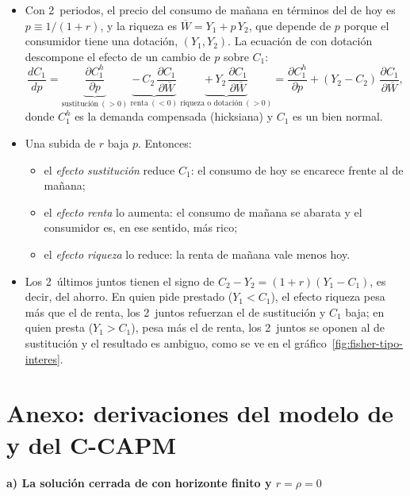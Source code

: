 \documentclass[11pt]{article}
\begin{document}
\begin{itemize}
\item Con 2~periodos, el precio del consumo de mañana en términos del de hoy es $p\equiv 1/(1+r)$, y la riqueza es $\overline{W}=Y_1+p\,Y_2$, que depende de $p$ porque el consumidor tiene una dotación, $(Y_1,Y_2)$. La ecuación de  con dotación  descompone el efecto de un cambio de $p$ sobre $C_1$:
  \begin{equation}
  \frac{dC_1}{dp}=\underbrace{\frac{\partial C_1^h}{\partial p}}_{\text{sustitución}\ (>0)}\ \underbrace{-\,C_2\,\frac{\partial C_1}{\partial\overline{W}}}_{\text{renta}\ (<0)}\ \underbrace{+\,Y_2\,\frac{\partial C_1}{\partial\overline{W}}}_{\text{riqueza o dotación}\ (>0)}=\frac{\partial C_1^h}{\partial p}+(Y_2-C_2)\,\frac{\partial C_1}{\partial\overline{W}},\label{eq:slutsky-dotacion}
  \end{equation}
  donde $C_1^h$ es la demanda compensada (hicksiana) y $C_1$ es un bien normal.
\item Una subida de $r$ baja $p$. Entonces:
  \begin{itemize}
  \item el \emph{efecto sustitución} reduce $C_1$: el consumo de hoy se encarece frente al de mañana;
  \item el \emph{efecto renta} lo aumenta: el consumo de mañana se abarata y el consumidor es, en ese sentido, más rico;
  \item el \emph{efecto riqueza} lo reduce: la renta de mañana vale menos hoy.
  \end{itemize}
\item Los 2~últimos juntos tienen el signo de $C_2-Y_2=(1+r)(Y_1-C_1)$, es decir, del ahorro. En quien pide prestado ($Y_1<C_1$), el efecto riqueza pesa más que el de renta, los 2~juntos refuerzan el de sustitución y $C_1$ baja; en quien presta ($Y_1>C_1$), pesa más el de renta, los 2~juntos se oponen al de sustitución y el resultado es ambiguo, como se ve en el gráfico~\ref{fig:fisher-tipo-interes}.\findemo
\end{itemize}

\section{Anexo: derivaciones del modelo de  y del C-CAPM}\label{anexo:hall-ccapm}

\paragraph{a) La solución cerrada de  con horizonte finito y $r=\rho=0$}
\end{document}
